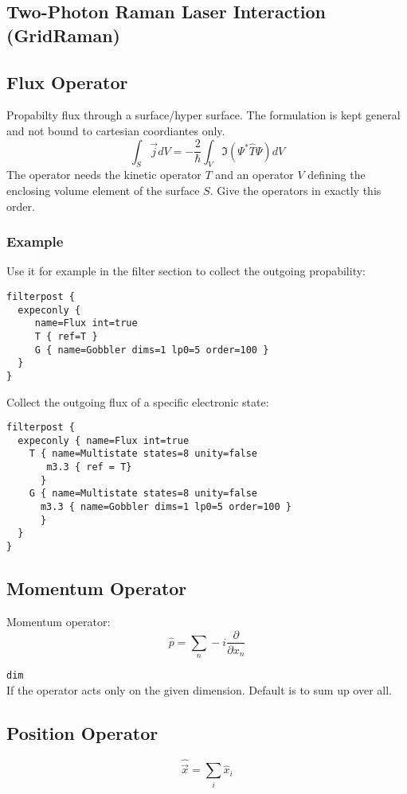 \documentclass[a4paper,12pt]{scrbook}
\newcommand{\option}[2]{\item \texttt{#1}\\ #2}
\begin{document}
\subsection{Two-Photon Raman Laser Interaction (GridRaman)}

\subsection{Flux Operator}
Propabilty flux through a surface/hyper surface. The formulation
is kept general and not bound to cartesian coordiantes only.
\begin{equation}
 \int_S \vec{j} dV = -\frac{2}{\hbar} \int_V \Im(\Psi^* \hat T \Psi)dV
\end{equation}
The operator needs the kinetic operator $T$ and an operator $V$
defining the enclosing volume element of the surface $S$.
Give the operators in exactly this order.

\subsubsection*{Example}
Use it for example in the filter section to collect the outgoing propability:
\begin{verbatim}
filterpost {
  expeconly {
     name=Flux int=true
     T { ref=T }
     G { name=Gobbler dims=1 lp0=5 order=100 }
  }
}
\end{verbatim}
Collect the outgoing flux of a specific electronic state:
\begin{verbatim}
filterpost {
  expeconly { name=Flux int=true
    T { name=Multistate states=8 unity=false
       m3.3 { ref = T}
      }
    G { name=Multistate states=8 unity=false
      m3.3 { name=Gobbler dims=1 lp0=5 order=100 }
      }
  }
}
\end{verbatim}

\subsection{Momentum Operator}
Momentum operator:
\begin{equation}
 \hat p = \sum_n -i \frac{\partial}{\partial x_n}
\end{equation}

\begin{options}
 \option{dim}{If the operator acts only on the given dimension. Default is to sum up over all.}
\end{options}

\subsection{Position Operator}
\begin{equation}
 \hat \vec{x} = \sum_i \hat x_i
\end{equation}
\end{document}
